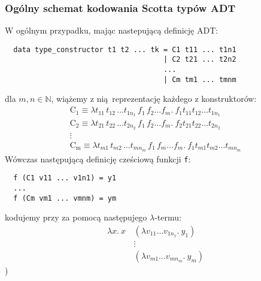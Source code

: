 \subsubsection{Ogólny schemat kodowania Scotta typów ADT}
W ogólnym przypadku, mając nastepującą definicję ADT:
\begin{verbatim}
  data type_constructor t1 t2 ... tk = C1 t11 ... t1n1
                                     | C2 t21 ... t2n2
                                     ...
                                     | Cm tm1 ... tmnm
\end{verbatim}
dla \(m, n \in \mathbb{N}\), wiążemy z nią reprezentację każdego z konstruktorów:
\begin{gather*}
  \mathrm{C_1} \equiv \lambda t_{11}\, t_{12}\, \dots t_{1n_1}\, f_1\, f_2 \dots f_m.\ f_1 t_{11} t_{12} \dots t_{1n_1}\\
  \mathrm{C_2} \equiv \lambda t_{21}\, t_{22}\, \dots t_{2n_2}\, f_1\, f_2 \dots f_m.\ f_2 t_{21} t_{22} \dots t_{2n_2}\\
 \vdots\\
  \mathrm{C_m} \equiv \lambda t_{m1}\, t_{m2}\, \dots t_{mn_m}\, f_1\, f_m \dots f_m.\ f_1 t_{m1} t_{m2} \dots t_{mn_m}
\end{gather*}
Wówczas następującą definicję cześciową funkcji \texttt{f}:
\begin{verbatim}
  f (C1 v11 ... v1n1) = y1
  ...
  f (Cm vm1 ... vmnm) = ym
\end{verbatim}
kodujemy przy za pomocą następujego \(\lambda\)-termu:
\begin{align*}
  \lambda x.\ x\,&(\lambda v_{11}\dots v_{1n_1}.\ y_1)\\
                 &\vdots\\
                 &(\lambda v_{m1}\dots v_{mn_m}.\ y_m)
\end{align*})

